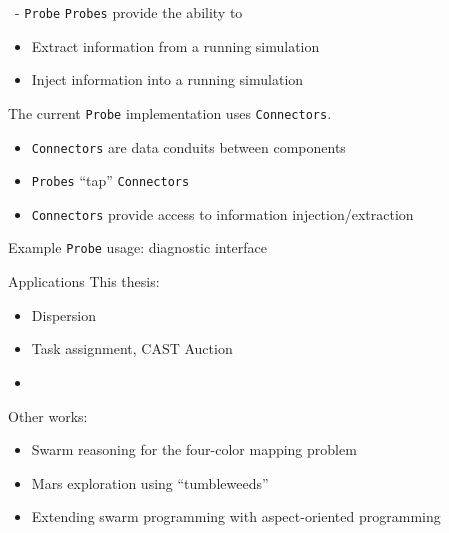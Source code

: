 \begin{slide}{\SWEEP~- \texttt{Probe}}
  \texttt{Probes} provide the ability to
  \begin{itemize}
  \item Extract information from a running simulation
  \item Inject information into a running simulation
  \end{itemize}
  
  \vspace{1em}
  
  The current \texttt{Probe} implementation uses \texttt{Connectors}.
  \begin{itemize}
  \item \texttt{Connectors} are data conduits between components
  \item \texttt{Probes} ``tap'' \texttt{Connectors}
  \item \texttt{Connectors} provide access to information injection/extraction
  \end{itemize}
  
  \vspace{1em}
  
  Example \texttt{Probe} usage: diagnostic interface
\end{slide}


\begin{slide}{\SWEEP Applications}
  This thesis:
  \begin{itemize}
  \item Dispersion
  \item Task assignment, CAST Auction
  \item {}
  \end{itemize}
  \bigskip
  Other works:
  \begin{itemize}
  \item Swarm reasoning for the four-color mapping problem
  \item Mars exploration using ``tumbleweeds''
  \item Extending swarm programming with aspect-oriented programming
  \end{itemize}
\end{slide}

